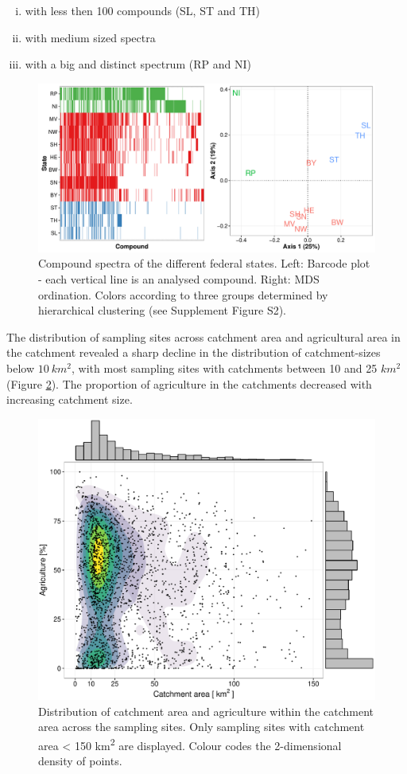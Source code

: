\documentclass[journal=esthag,manuscript=article]{achemso}
\begin{document}
\begin{enumerate}[i)]
	\item with less then 100 compounds (SL, ST and TH)
	\item with medium sized spectra
	\item with a big and distinct spectrum (RP and NI)
\end{enumerate}

\begin{figure}[ht]
  \includegraphics[width=\textwidth]{figure2.pdf}
  \caption{Compound spectra of the different federal states. Left: Barcode plot - each vertical line is an analysed compound. Right: MDS ordination. 
  Colors according to three groups determined by hierarchical clustering (see Supplement Figure S2).}
  \label{fig:fig2}
\end{figure}

The distribution of sampling sites across catchment area and agricultural area in the catchment revealed a sharp decline in the distribution of catchment-sizes below $10~km^2$, with most sampling sites with catchments between 10 and 25 $km^2$ (Figure \ref{fig:fig3}).
The proportion of agriculture in the catchments decreased with increasing catchment size.

\begin{figure}[ht]
  \includegraphics[width=.8\textwidth]{figure3.pdf}
  \caption{Distribution of catchment area and agriculture within the catchment area across the sampling sites.
  Only sampling sites with catchment area < 150 km\textsuperscript{2} are displayed. 
  Colour codes the 2-dimensional density of points.}
  \label{fig:fig3}
\end{figure}
\end{document}
